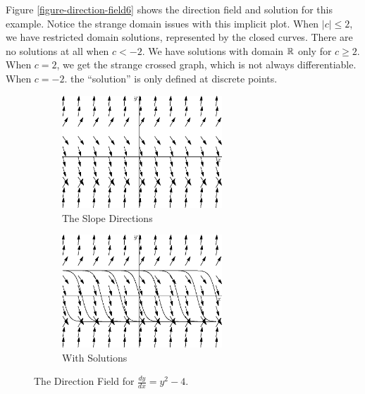 \documentclass[fleqn,letterpaper]{report}
\begin{document}
Figure \ref{figure-direction-field6} shows the direction
field and solution for this example.  Notice the strange
domain issues with this implicit plot. When $|c| \leq 2$, we
have restricted domain solutions, represented by the closed
curves. There are no solutions at all when $c < -2$. We have
solutions with domain $\mathbb{R}$ only for $c \geq 2$. When $c = 2$,
we get the strange crossed graph, which is not always
differentiable. When $c=-2$. the ``solution'' is only defined
at discrete points.

\begin{figure}[t]
\centering
\begin{subfigure}{.5\textwidth}
\centering
\includegraphics[width=6cm]{figure18.eps}
\caption{The Slope Directions}
\end{subfigure}%
\begin{subfigure}{.5\textwidth}
\centering
\includegraphics[width=6cm]{figure19.eps}
\caption{With Solutions}
\end{subfigure}
\caption{The Direction Field for $\frac{dy}{dx} = y^2-4$.}
\label{figure-direction-field7}
\end{figure}
\end{document}
